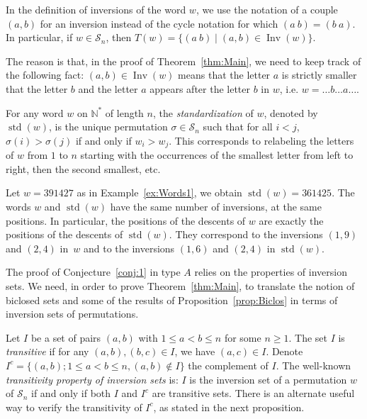 \documentclass[Unicode]{cedram-alco}
\theoremstyle{definition}
\newcommand{\Sym}[1]{\mathcal{S}_{#1}}
\newcommand{\Symn}{\Sym{n}}
\newcommand{\NN}{\mathbb{N}}
\DeclareMathOperator{\std}{std}
\DeclareMathOperator{\invs}{Inv}
\begin{document}
\begin{remark} In the definition of inversions of the word $w$, we use the notation of a couple $(a,b)$ for an inversion instead of the cycle notation for which $(a\ b)=(b\ a)$.  In particular, if $w\in\Symn$, then $T(w)=\{(a\ b)\mid (a,b)\in\invs(w)\}$.

The reason is that, in the proof of Theorem~\ref{thm:Main}, we need to keep track of the following fact:  $(a,b)\in \invs(w)$ means that the letter $a$ is strictly smaller that the letter $b$ and the letter $a$ appears after the letter $b$ in $w$, i.e.  $w=\dots b\dots a\dots$.
\end{remark}


For any word $w$ on $\NN^*$ of length $n$, the \emph{standardization} of $w$, denoted by $\std(w)$, is the unique permutation $\sigma\in \Symn$ such that for all $i < j$, $\sigma(i) > \sigma(j)$ if and only if $w_i > w_j$.  This corresponds to relabeling the letters of $w$ from $1$ to $n$ starting with the occurrences of the smallest letter from left to right, then the second smallest, etc. 

\begin{ex} Let $w =391427$ as in Example~\ref{ex:Words1}, we obtain $\std(w) = 361425$. The words $w$ and $\std(w)$ have the same number of inversions, at the same positions. In particular, the positions of the descents of $w$ are exactly the positions of the descents of $\std(w)$. They correspond to the inversions $(1,9)$ and $(2,4)$ in~$w$ and to the inversions $(1,6)$ and $(2,4)$  in $\std(w)$.
\end{ex}

The proof of Conjecture~\ref{conj:1} in type $A$ relies on the properties of  inversion sets.  We need, in order to prove Theorem~\ref{thm:Main}, to translate the notion of biclosed sets  and some of the results of Proposition~\ref{prop:Biclos} in terms of inversion sets of permutations. 

Let $I$ be a set of pairs $(a,b)$ with $1 \leq a < b \leq n$ for some $n \geq 1$. The set $I$ is {\em transitive} if for any $(a,b),(b,c) \in I$, we have $(a,c) \in I$.  Denote $I^c = \lbrace (a,b); 1 \leq a < b \leq n, (a,b) \not\in I \rbrace$ the complement of $I$. The well-known {\em transitivity property of inversion sets} is:  $I$ is the inversion set of a permutation $w$ of $\Symn$ if and only if both $I$ and $I^c$  are transitive sets.  There is an alternate useful way to verify the transitivity of $I^c$, as stated in the next proposition. 
\end{document}
